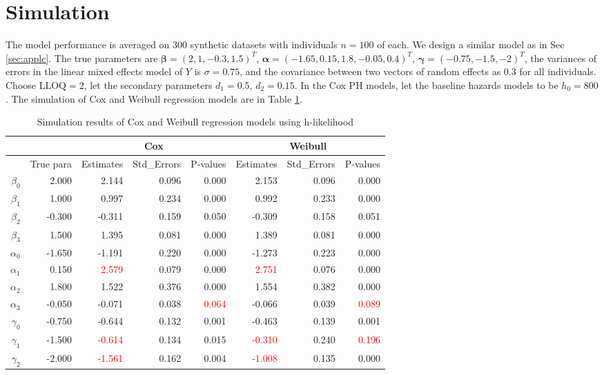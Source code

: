 \section{Simulation}
\label{sec:simul}

The model performance is averaged on $300$ synthetic datasets with individuals $n=100$ of each. We design a similar model as in Sec \ref{sec:applc}. The true parameters are $\boldsymbol{\beta}=(2,1,-0.3,1.5)^T$, $\boldsymbol{\alpha}=(-1.65,0.15,1.8,-0.05,0.4)^T$, $\boldsymbol{\gamma}=(-0.75,-1.5,-2)^T$, the variances of errors in the linear mixed effects model of $Y$ is $\sigma=0.75$, and the covariance between two vectors of random effects as $0.3$ for all individuals. Choose $\text{LLOQ}=2$, let the secondary parameters $d_1=0.5$, $d_2=0.15$. In the Cox PH models, let the baseline hazards models to be $h_0=800$. The simulation of Cox and Weibull regression models are in Table \ref{tbl:siml}.
\begin{table}[ht]
\centering
\caption{Simulation results of Cox and Weibull regression models using h-likelihood}
\begin{tabular}{rr|rrr|rrr}
  \hline
   & & \multicolumn{3}{c|}{Cox} &  \multicolumn{3}{c}{Weibull} \\
  \hline
   & True para & Estimates & Std\_Errors & P-values & Estimates & Std\_Errors & P-values \\ 
  \hline
  $\beta_0$ & 2.000 & 2.144 & 0.096  & 0.000 & 2.153 & 0.096  & 0.000 \\ 
  $\beta_1$ & 1.000 & 0.997 & 0.234 & 0.000 & 0.992 & 0.233 & 0.000 \\ 
  $\beta_2$ & -0.300 & -0.311 & 0.159  & 0.050 & -0.309 & 0.158  & 0.051 \\ 
  $\beta_3$ & 1.500 & 1.395 & 0.081  & 0.000 & 1.389 & 0.081  & 0.000 \\ 
   \hline
  $\alpha_0$ & -1.650 & -1.191 & 0.220  & 0.000 & -1.273 & 0.223  & 0.000 \\ 
  $\alpha_1$ & 0.150 & \textcolor{red}{2.579} & 0.079  & 0.000 & \textcolor{red}{2.751} & 0.076  & 0.000 \\ 
  $\alpha_2$ & 1.800 & 1.522 & 0.376 & 0.000 & 1.554 & 0.382 & 0.000 \\ 
  $\alpha_3$ & -0.050 & -0.071 & 0.038  & \textcolor{red}{0.064} & -0.066 & 0.039  & \textcolor{red}{0.089} \\ 
  \hline
  $\gamma_0$ & -0.750 & -0.644 & 0.132  & 0.001 & -0.463 & 0.139  & 0.001 \\ 
  $\gamma_1$ & -1.500 & \textcolor{red}{-0.614} & 0.134  & 0.015 & \textcolor{red}{-0.310} & 0.240  & \textcolor{red}{0.196} \\ 
  $\gamma_2$ & -2.000 & \textcolor{red}{-1.561} & 0.162 & 0.004 & \textcolor{red}{-1.008} & 0.135  & 0.000 \\ 
   \hline
\end{tabular}
\label{tbl:siml}
\end{table}


